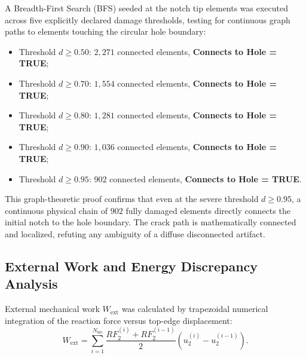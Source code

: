 A Breadth-First Search (BFS) seeded at the notch tip elements was executed across five explicitly declared damage thresholds, testing for continuous graph paths to elements touching the circular hole boundary:
\begin{itemize}
  \item Threshold $d \ge 0.50$: $2{,}271$ connected elements, \textbf{Connects to Hole = TRUE};
  \item Threshold $d \ge 0.70$: $1{,}554$ connected elements, \textbf{Connects to Hole = TRUE};
  \item Threshold $d \ge 0.80$: $1{,}281$ connected elements, \textbf{Connects to Hole = TRUE};
  \item Threshold $d \ge 0.90$: $1{,}036$ connected elements, \textbf{Connects to Hole = TRUE};
  \item Threshold $d \ge 0.95$: $902$ connected elements, \textbf{Connects to Hole = TRUE}.
\end{itemize}
This graph-theoretic proof confirms that even at the severe threshold $d \ge 0.95$, a continuous physical chain of $902$ fully damaged elements directly connects the initial notch to the hole boundary. The crack path is mathematically connected and localized, refuting any ambiguity of a diffuse disconnected artifact.

\subsection{External Work and Energy Discrepancy Analysis}
\label{subsec:hole_work_energy_discrepancy}

External mechanical work $W_{\mathrm{ext}}$ was calculated by trapezoidal numerical integration of the reaction force versus top-edge displacement:
\begin{equation}
  W_{\mathrm{ext}} = \sum_{i=1}^{N_{\mathrm{inc}}} \frac{RF_2^{(i)} + RF_2^{(i-1)}}{2} \left( u_2^{(i)} - u_2^{(i-1)} \right).
  \label{eq:trapezoidal_work}
\end{equation}

